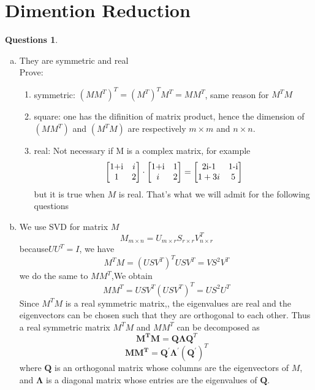 \documentclass[a4paper,11pt]{article}
\theoremstyle{definition}
\newtheorem{quests}{Questions}
\begin{document}
\section{Dimention Reduction}
\begin{quests}
\leavevmode\\

\begin{enumerate}[(a)]

\item They are symmetric and real\\
Prove:
\begin{enumerate}[*]
\item symmetric: $(MM^{T})^{T} = (M^{T})^{T}M^{T} = MM^{T}$, same reason for $M^{T}M$
\item square: one has the difinition of matrix product, hence the dimension of $(MM^{T})$ and $(M^{T}M)$ are respectively ${m \times m}$ and ${n \times n}$. 
\item{
real: Not necessary if M is a complex matrix, for example 
\[\begin{bmatrix}
    $1+i$   & i  \\
    1       & 2 
\end{bmatrix}
\cdot
\begin{bmatrix}
    $1+i$   & 1  \\
    i       & 2 
\end{bmatrix}
=
\begin{bmatrix}
    $2i-1$   &$1-i$  \\
    1+3i     & 5 
\end{bmatrix}
\]
but it is true when $M$ is real. That's what we will admit for the following questions
}
\end{enumerate}
\item We use SVD for matrix $M$
$$M_{m \times n}=U_{m \times r}S_{r \times r}V_{n \times r}^T$$
because$UU^T=I$, we have
$$M^TM=(USV^T)^TUSV^T=VS^2V^T$$
we do the same to $MM^T$,We obtain
$$MM^T=USV^T(USV^T)^T=US^2U^T$$
Since $M^{T}M$ is a real symmetric matrix,, the eigenvalues are real and the eigenvectors can be chosen such that they are orthogonal to each other. Thus a real symmetric matrix $M^{T}M$ and $MM^{T}$  can be decomposed as\\
$$\mathbf {M^{T}M} =\mathbf {Q} \mathbf {\Lambda } \mathbf {Q} ^{T}$$
$$\mathbf {MM^{T}} =\mathbf {Q}^\prime \mathbf {\Lambda }^\prime (\mathbf {Q}^\prime) ^{T}$$
where $\mathbf{Q}$ is an orthogonal matrix whose columns are the eigenvectors of $M$, and $\mathbf {\Lambda }$ is a diagonal matrix whose entries are the eigenvalues of  $\mathbf{Q}$.\\

\end{enumerate}
\end{quests}
\end{document}
